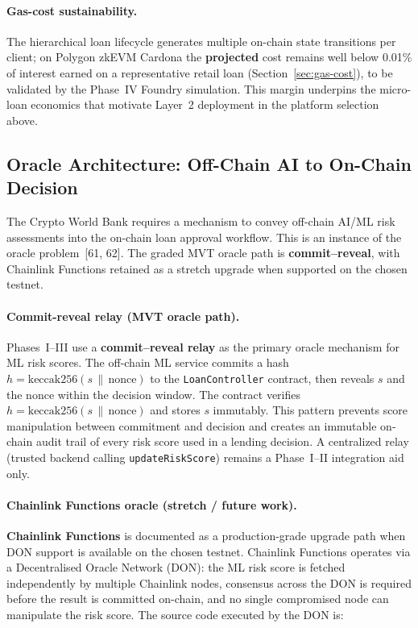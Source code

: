 \documentclass[12pt,a4paper]{report}
\begin{document}
\paragraph{Gas-cost sustainability.}
The hierarchical loan lifecycle generates multiple on-chain state transitions per client; on Polygon zkEVM Cardona the \textbf{projected} cost remains well below 0.01\% of interest earned on a representative retail loan (Section~\ref{sec:gas-cost}), to be validated by the Phase~IV Foundry simulation. This margin underpins the micro-loan economics that motivate Layer~2 deployment in the platform selection above.

\subsection{Oracle Architecture: Off-Chain AI to On-Chain Decision}
\label{sec:oracle-architecture}

The Crypto World Bank requires a mechanism to convey off-chain AI/ML risk assessments into the on-chain loan approval workflow. This is an instance of the oracle problem~[61, 62]. The graded MVT oracle path is \textbf{commit--reveal}, with Chainlink Functions retained as a stretch upgrade when supported on the chosen testnet.

\paragraph{Commit-reveal relay (MVT oracle path).}
Phases~I--III use a \textbf{commit--reveal relay} as the primary oracle mechanism for ML risk scores. The off-chain ML service commits a hash $h = \text{keccak256}(s \,\|\, \text{nonce})$ to the \texttt{LoanController} contract, then reveals $s$ and the nonce within the decision window. The contract verifies $h = \text{keccak256}(s \,\|\, \text{nonce})$ and stores $s$ immutably. This pattern prevents score manipulation between commitment and decision and creates an immutable on-chain audit trail of every risk score used in a lending decision. A centralized relay (trusted backend calling \texttt{updateRiskScore}) remains a Phase~I--II integration aid only.

\paragraph{Chainlink Functions oracle (stretch / future work).}
\textbf{Chainlink Functions} is documented as a production-grade upgrade path when DON support is available on the chosen testnet. Chainlink Functions operates via a Decentralised Oracle Network (DON): the ML risk score is fetched independently by multiple Chainlink nodes, consensus across the DON is required before the result is committed on-chain, and no single compromised node can manipulate the risk score. The source code executed by the DON is:
\end{document}
